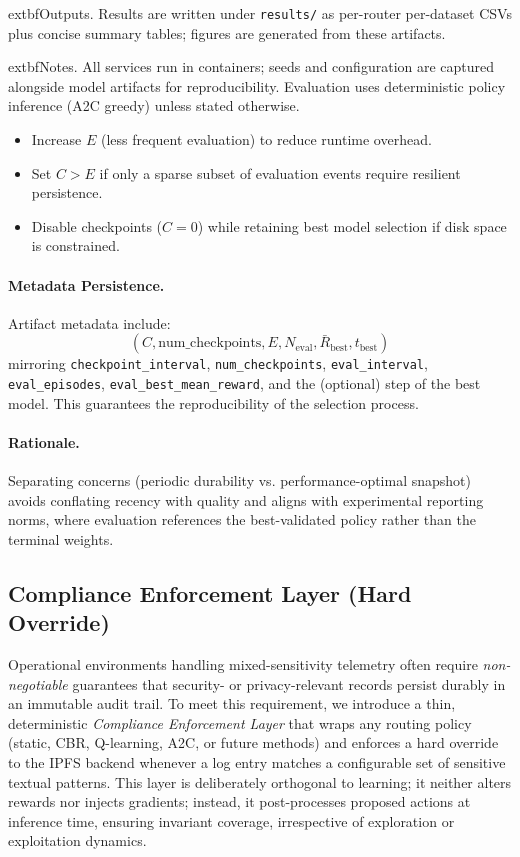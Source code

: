 	extbf{Outputs.} Results are written under \texttt{results/} as per-router per-dataset CSVs plus concise summary tables; figures are generated from these artifacts.

	extbf{Notes.} All services run in containers; seeds and configuration are captured alongside model artifacts for reproducibility. Evaluation uses deterministic policy inference (A2C greedy) unless stated otherwise.
\begin{itemize}
  \item Increase $E$ (less frequent evaluation) to reduce runtime overhead.
  \item Set $C > E$ if only a sparse subset of evaluation events require resilient persistence.
  \item Disable checkpoints ($C=0$) while retaining best model selection if disk space is constrained.
\end{itemize}

\paragraph{Metadata Persistence.}
Artifact metadata include:
\[
(C, \text{num\_checkpoints}, E, N_{\text{eval}}, \bar{R}_{\text{best}}, t_{\text{best}})
\]
mirroring \texttt{checkpoint\_interval}, \texttt{num\_checkpoints}, \texttt{eval\_interval}, \texttt{eval\_episodes}, \texttt{eval\_best\_mean\_reward}, and the (optional) step of the best model. This guarantees the reproducibility of the selection process.

\paragraph{Rationale.}
Separating concerns (periodic durability vs. performance-optimal snapshot) avoids conflating recency with quality and aligns with experimental reporting norms, where evaluation references the best-validated policy rather than the terminal weights.


\subsection{Compliance Enforcement Layer (Hard Override)}\label{s:compliance-layer}

Operational environments handling mixed-sensitivity telemetry often require \emph{non-negotiable} guarantees that security- or privacy-relevant records persist durably in an immutable audit trail. To meet this requirement, we introduce a thin, deterministic \emph{Compliance Enforcement Layer} that wraps any routing policy (static, CBR, Q-learning, A2C, or future methods) and enforces a hard override to the IPFS backend whenever a log entry matches a configurable set of sensitive textual patterns. This layer is deliberately orthogonal to learning; it neither alters rewards nor injects gradients; instead, it post-processes proposed actions at inference time, ensuring invariant coverage, irrespective of exploration or exploitation dynamics.

